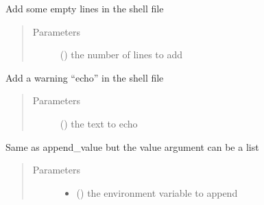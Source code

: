 \documentclass[a4paper,10pt,english]{sphinxmanual}
\begin{document}
\begin{fulllineitems}
\begin{fulllineitems}
\label{\detokenize{commands/apidoc/src:src.fileEnviron.ScreenEnviron.add_line}}
Add some empty lines in the shell file
\begin{quote}\begin{description}
\item[{Parameters}] \leavevmode
{} () \textendash{} the number of lines to add

\end{description}\end{quote}

\end{fulllineitems}


\begin{fulllineitems}
\label{\detokenize{commands/apidoc/src:src.fileEnviron.ScreenEnviron.add_warning}}
Add a warning “echo” in the shell file
\begin{quote}\begin{description}
\item[{Parameters}] \leavevmode
{} () \textendash{} the text to echo

\end{description}\end{quote}

\end{fulllineitems}


\begin{fulllineitems}
\label{\detokenize{commands/apidoc/src:src.fileEnviron.ScreenEnviron.append}}
Same as append\_value but the value argument can be a list
\begin{quote}\begin{description}
\item[{Parameters}] \leavevmode\begin{itemize}
\item {} 
 () \textendash{} the environment variable to append


\end{itemize}
\end{description}
\end{quote}
\end{fulllineitems}
\end{fulllineitems}
\end{document}
